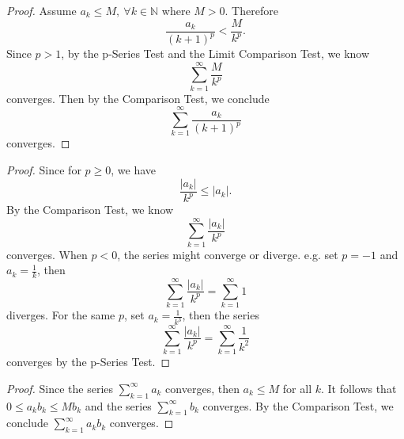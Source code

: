 \documentclass{report}
\begin{document}
\vspace{12pt}
\begin{Exercise}
\begin{proof}
Assume $a_k \leq M,\ \forall k \in \mathbb{N} $ where $M > 0$. Therefore $$ \frac{a_k}{(k+1)^p} < \frac{M}{k^p}. $$
Since $p>1$, by the p-Series Test and the Limit Comparison Test, we know $$\sum_{k=1}^{\infty}\frac{M}{k^p}$$ converges. Then by the Comparison Test, we conclude $$\sum_{k=1}^{\infty}\frac{a_k}{(k+1)^p}$$ converges.
\end{proof}
\end{Exercise}

\setcounter{Exercise}{4}
\vspace{12pt}
\begin{Exercise}
\begin{proof}
Since for $p \geq 0$, we have $$\frac{|a_k|}{k^p} \leq |a_k|.$$
By the Comparison Test, we know $$\sum_{k=1}^{\infty}\frac{|a_k|}{k^p}$$
converges. When $p < 0$, the series might converge or diverge. e.g. set $p=-1$ and $a_k=\frac{1}{k}$, then $$\sum_{k=1}^{\infty}\frac{|a_k|}{k^p} = \sum_{k=1}^{\infty}1$$ diverges. For the same $p$, set $a_k = \frac{1}{k^3}$, then the series $$\sum_{k=1}^{\infty}\frac{|a_k|}{k^p} = \sum_{k=1}^{\infty}\frac{1}{k^2}$$ converges by the p-Series Test.
\end{proof}
\end{Exercise}

\setcounter{Exercise}{6}
\vspace{12pt}
\begin{Exercise}
\begin{proof}
Since the series $\sum_{k=1}^{\infty}a_k$ converges, then $a_k \leq M$ for all $k$. It follows that $0 \leq a_kb_k \leq Mb_k$ and the series  $\sum_{k=1}^{\infty}b_k$ converges. By the Comparison Test, we conclude $\sum_{k=1}^{\infty}a_kb_k$ converges.
\end{proof}
\end{Exercise}
\end{document}
